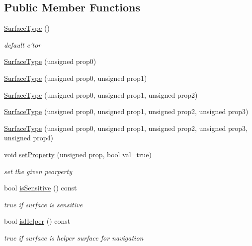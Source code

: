 \subsection*{Public Member Functions}
\begin{DoxyCompactItemize}
\item 
\hyperlink{class_d_d_surfaces_1_1_surface_type_a730d529362ea56aba0a47e20b7a017e7}{SurfaceType} ()
\begin{DoxyCompactList}\small\item\em default c'tor \item\end{DoxyCompactList}\item 
\hyperlink{class_d_d_surfaces_1_1_surface_type_a1eddfb236b06b6d2073b9cf5db598bc8}{SurfaceType} (unsigned prop0)
\item 
\hyperlink{class_d_d_surfaces_1_1_surface_type_a080fbe4b3790adf465b77f5187440e31}{SurfaceType} (unsigned prop0, unsigned prop1)
\item 
\hyperlink{class_d_d_surfaces_1_1_surface_type_a1edfc7bc6145d352f1dff360f91b97c0}{SurfaceType} (unsigned prop0, unsigned prop1, unsigned prop2)
\item 
\hyperlink{class_d_d_surfaces_1_1_surface_type_a14d8c8c9ca24104930ff64b27774b916}{SurfaceType} (unsigned prop0, unsigned prop1, unsigned prop2, unsigned prop3)
\item 
\hyperlink{class_d_d_surfaces_1_1_surface_type_ac5fb5d83f865a805ea0fdbe799e50e5b}{SurfaceType} (unsigned prop0, unsigned prop1, unsigned prop2, unsigned prop3, unsigned prop4)
\item 
void \hyperlink{class_d_d_surfaces_1_1_surface_type_aac5ebe16c0c230033f68c4e3f5a349af}{setProperty} (unsigned prop, bool val=true)
\begin{DoxyCompactList}\small\item\em set the given peorperty \item\end{DoxyCompactList}\item 
bool \hyperlink{class_d_d_surfaces_1_1_surface_type_a406663d411a53cb361b6aaca88c93b48}{isSensitive} () const 
\begin{DoxyCompactList}\small\item\em true if surface is sensitive \item\end{DoxyCompactList}\item 
bool \hyperlink{class_d_d_surfaces_1_1_surface_type_ad6fc85f3eb2522703ec7819bccae04df}{isHelper} () const 
\begin{DoxyCompactList}\small\item\em true if surface is helper surface for navigation \item\end{DoxyCompactList}\item 

\end{DoxyCompactItemize}
